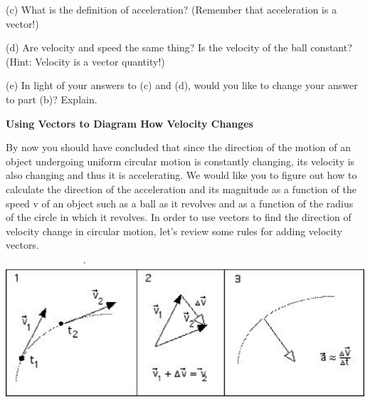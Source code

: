 (c) What is the definition of acceleration? (Remember that acceleration is a
vector!)
\vspace{20mm}

(d) Are velocity and speed the same thing? Is the velocity of the ball constant?
(Hint: Velocity is a vector quantity!)
\vspace{20mm}

(e) In light of your answers to (c) and (d), would you like to change your answer
to part (b)? Explain.
\vspace{20mm}

\textbf{Using Vectors to Diagram How Velocity Changes} 

By now you should have concluded that since the direction of the motion of an
object undergoing uniform circular motion is constantly changing, its velocity
is also changing and thus it is accelerating. We would like you to figure out
how to calculate the direction of the acceleration and its magnitude as a function
of the speed v of an object such as a ball as it revolves and as a function
of the radius of the circle in which it revolves. In order to use vectors to
find the direction of velocity change in circular motion, let's review some
rules for adding velocity vectors.

\vspace{0.3cm}
{\par\centering \includegraphics{circ_motion_fig1.eps} \par}
\vspace{0.3cm}

